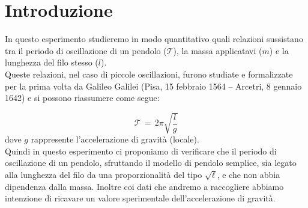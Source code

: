 \section{Introduzione}


In questo esperimento studieremo in modo quantitativo quali relazioni sussistano tra il periodo di oscillazione di un pendolo ($\mathcal{T}$), la massa applicatavi ($m$) e la lunghezza del filo stesso ($l$).\\
Queste relazioni, nel caso di piccole oscillazioni, furono studiate e formalizzate per la prima volta da Galileo Galilei (Pisa, 15 febbraio 1564 – Arcetri, 8 gennaio 1642) e si possono riassumere come segue:

\begin{equation}
    \label{eq:periodo_pendolo}
	\mathcal{T} \,=\, 2\pi\sqrt{\frac{l}{g}}
\end{equation}
%
dove $g$ rappresente l'accelerazione di gravità (locale).\\
Quindi in questo esperimento ci proponiamo di verificare che il periodo di oscillazione di un pendolo,
sfruttando il modello di pendolo semplice, sia legato alla lunghezza del filo da una proporzionalità del tipo $\sqrt{\ell}$,
e che non abbia dipendenza dalla massa.
Inoltre coi dati che andremo a raccogliere abbiamo intenzione di ricavare un valore sperimentale dell'accelerazione di gravità.
